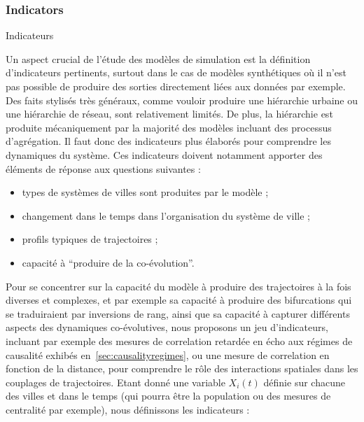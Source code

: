\subsubsection{Indicators}{Indicateurs}

Un aspect crucial de l'étude des modèles de simulation est la définition d'indicateurs pertinents, surtout dans le cas de modèles synthétiques où il n'est pas possible de produire des sorties directement liées aux données par exemple. Des faits stylisés très généraux, comme vouloir produire une hiérarchie urbaine ou une hiérarchie de réseau, sont relativement limités. %
 De plus, la hiérarchie est produite mécaniquement par la majorité des modèles incluant des processus d'agrégation. Il faut donc des indicateurs plus élaborés pour comprendre les dynamiques du système. Ces indicateurs doivent notamment apporter des éléments de réponse aux questions suivantes : 
 \begin{itemize}
 	\item types de systèmes de villes sont produites par le modèle ;
 	\item changement dans le temps dans l'organisation du système de ville ;
 	\item profils typiques de trajectoires ;
 	\item capacité à ``produire de la co-évolution''.
 \end{itemize}


Pour se concentrer sur la capacité du modèle à produire des trajectoires à la fois diverses et complexes, et par exemple sa capacité à produire des bifurcations qui se traduiraient par inversions de rang, ainsi que sa capacité à capturer différents aspects des dynamiques co-évolutives, nous proposons un jeu d'indicateurs, incluant par exemple des mesures de correlation retardée en écho aux régimes de causalité exhibés en~\ref{sec:causalityregimes}, ou une mesure de correlation en fonction de la distance, pour comprendre le rôle des interactions spatiales dans les couplages de trajectoires. Etant donné une variable $X_i(t)$ définie sur chacune des villes et dans le temps (qui pourra être la population ou des mesures de centralité par exemple), nous définissons les indicateurs :

